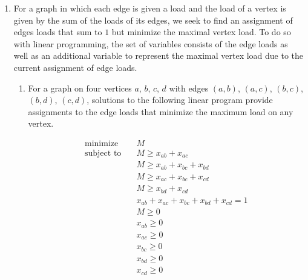 \documentclass[letterpaper,11pt]{article}
\begin{document}
\begin{enumerate}
\begin{proof}
            Adding up inequalities \eqref{ineq:oneminusalphax} and
            \eqref{ineq:alphax}, we arrive at the statement we wish to prove,
            which completes the proof.

            Alternatively, suppose that a point on the line between $x$ and
            $x^\prime$ were not a feasible solution. Geometrically, that would
            be a contradiction of the convexity of the feasible region. Hence,
            all points on a line between any two feasible solutions must be
            feasible solutions.
        \end{proof}

    \item For a graph in which each edge is given a load and the load of a
        vertex is given by the sum of the loads of its edges, we seek to find
        an assignment of edges loads that sum to $1$ but minimize the maximal
        vertex load. To do so with linear programming, the set of variables
        consists of the edge loads as well as an additional variable to
        represent the maximal vertex load due to the current assignment of edge
        loads.

        \begin{enumerate}
            \item For a graph on four vertices $a$, $b$, $c$, $d$ with edges
                $(a, b)$, $(a, c)$, $(b, c)$, $(b, d)$, $(c, d)$, solutions
                to the following linear program provide assignments to the
                edge loads that minimize the maximum load on any vertex.

                \begin{align*}
                    \text{minimize} \quad &
                        M \\
                    \text{subject to} \quad
                        & M \geq x_{ab} + x_{ac} \\
                        & M \geq x_{ab} + x_{bc} + x_{bd} \\
                        & M \geq x_{ac} + x_{bc} + x_{cd} \\
                        & M \geq x_{bd} + x_{cd} \\
                        & x_{ab} + x_{ac} + x_{bc} + x_{bd} + x_{cd} = 1 \\
                        & M \geq 0 \\
                        & x_{ab} \geq 0 \\
                        & x_{ac} \geq 0 \\
                        & x_{bc} \geq 0 \\
                        & x_{bd} \geq 0 \\
                        & x_{cd} \geq 0
                \end{align*}


\end{enumerate}
\end{enumerate}
\end{document}
